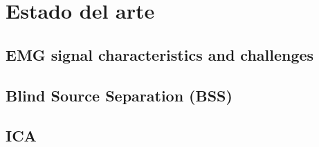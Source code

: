 \chapter{Estado del arte}

\section{EMG signal characteristics and challenges}
\section{Blind Source Separation (BSS)}
\section{ICA}